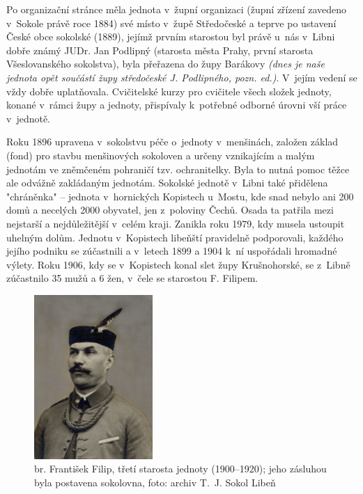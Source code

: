 \documentclass[a5paper, 12pt, twoside]{article}
\newcommand{\pozned}[1]{%
\textit{#1}}
\begin{document}
Po organizační stránce měla jednota v~župní organizaci (župní zřízení zavedeno v~Sokole právě roce 1884) své místo v~župě Středočeské a teprve po ustavení České obce sokolské (1889), jejímž prvním starostou byl právě u~nás v~Libni dobře známý JUDr. Jan Podlipný (starosta města Prahy, první starosta Všeslovanského sokolstva), byla přeřazena do župy Barákovy \pozned{(dnes je naše jednota opět součástí župy středočeské J. Podlipného, pozn. ed.)}. V~jejím vedení se vždy dobře uplatňovala. Cvičitelské kurzy pro cvičitele všech složek jednoty, konané v~rámci župy a jednoty, přispívaly k~potřebné odborné úrovni vší práce v~jednotě.

Roku 1896 upravena v~sokolstvu péče o~jednoty v~menšinách, založen základ (fond) pro stavbu menšinových sokoloven a určeny vznikajícím a malým jednotám ve zněmčeném pohraničí tzv. ochranitelky. Byla to nutná pomoc těžce ale odvážně zakládaným jednotám. Sokolské jednotě v~Libni také přidělena "chráněnka" – jednota v~hornických Kopistech u~Mostu, kde snad nebylo ani 200 domů a necelých 2000 obyvatel, jen z~poloviny Čechů. Osada ta patřila mezi nejstarší a nejdůležitější v~celém kraji. Zanikla roku 1979, kdy musela ustoupit uhelným dolům. Jednotu v~Kopistech libeňští pravidelně podporovali, každého jejího podniku se zúčastnili a v~letech 1899 a 1904 k~ní uspořádali hromadné výlety. Roku 1906, kdy se v~Kopistech konal slet župy Krušnohorské, se z~Libně zúčastnilo 35 mužů a 6 žen, v~čele se starostou F. Filipem.

\begin{figure}[h!]
  \centering
  \includegraphics[width=0.4\textwidth]{img/filip_starosta.jpg}
  \caption*{br. František Filip, třetí starosta jednoty (1900–⁠⁠⁠⁠⁠⁠1920); jeho zásluhou byla postavena sokolovna, foto: archiv T.~J. Sokol Libeň}
\end{figure}
\end{document}
